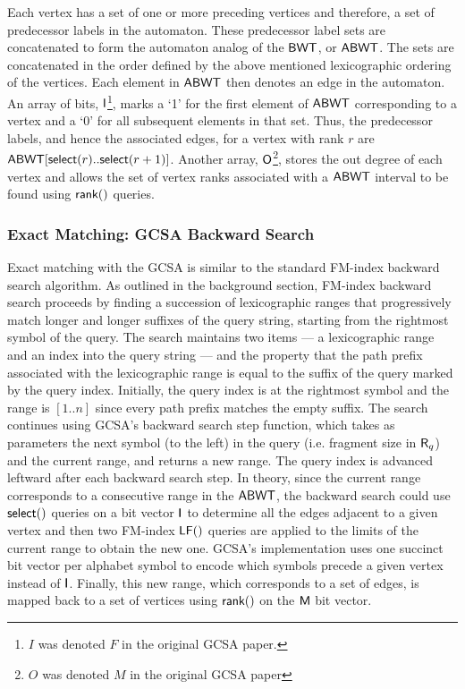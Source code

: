 Each vertex has a set of one or more preceding vertices and therefore, a set of predecessor labels in the
automaton. These predecessor label sets are concatenated to form the automaton analog of the $\mbox{\rm {\sf BWT}}$, or $\mbox{\rm {\sf ABWT}}$. The sets are concatenated in the
order defined by the above mentioned lexicographic ordering of the vertices. Each element in $\mbox{\rm {\sf ABWT}}$ then
denotes an edge in the automaton. An array of bits, $\mbox{\rm {\sf I}}$\footnote{$I$ was denoted $F$ in the original GCSA paper.}, marks a `1' for the first element of $\mbox{\rm {\sf ABWT}}$
corresponding to a vertex and a `0' for all subsequent elements in that set. Thus, the predecessor labels,
and hence the associated edges, for a vertex with rank $r$ are $\mbox{\rm {\sf ABWT}}[\textsf{select}(r)..\textsf{select}(r+1)]$. Another
array, $\mbox{\rm {\sf O}}$\footnote{$O$ was denoted $M$ in the original GCSA paper}, stores the out degree of each vertex and allows the set of vertex ranks associated with a $\mbox{\rm {\sf ABWT}}$
interval to be found using $\textsf{rank}()$ queries.



\subsubsection{Exact Matching: GCSA Backward Search}


Exact matching with the GCSA is similar to the standard FM-index backward search algorithm. As outlined in the background section, FM-index backward search proceeds by finding a succession of lexicographic ranges that progressively match longer and longer suffixes of the query string, starting from the rightmost symbol of the query. The search maintains two items --- a lexicographic range and an index into the query string --- and the property that the path prefix associated with the lexicographic range is equal to the suffix of the query marked by the query index. Initially, the query index is at the rightmost symbol and the range is $[1..n]$ since every path prefix matches the empty suffix.  The search continues using GCSA's backward search step function, which takes as parameters the next symbol (to the left) in the query (i.e. fragment size in $\mbox{\rm {\sf R}}_q$) and the current range, and returns a new range.  The query index is advanced leftward after each backward search step.  In theory, since the current range corresponds to a consecutive range in the $\mbox{\rm {\sf ABWT}}$, the backward search could use  $\textsf{select}()$ queries on a bit vector $\mbox{\rm {\sf I}}$ to determine all the edges adjacent to a given vertex and then two FM-index $\mbox{\rm {\sf LF}}()$ queries are applied to the limits of the current range to obtain the new one.  GCSA's implementation uses one succinct bit vector per alphabet symbol to encode which symbols precede a given vertex instead of $\mbox{\rm {\sf I}}$.  Finally, this new range, which corresponds to a set of edges, is mapped back to a set of vertices using $\textsf{rank}()$ on the $\mbox{\rm {\sf M}}$ bit vector.


